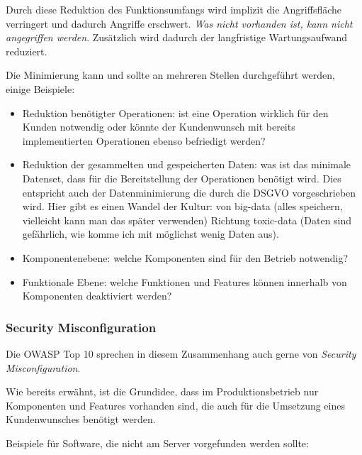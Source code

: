 Durch diese Reduktion des Funktionsumfangs wird implizit die Angriffsfläche verringert und dadurch Angriffe erschwert. \textit{Was nicht vorhanden ist, kann nicht angegriffen werden}. Zusätzlich wird dadurch der langfristige Wartungsaufwand reduziert.

Die Minimierung kann und sollte an mehreren Stellen durchgeführt werden, einige Beispiele:

\begin{itemize}
	\item Reduktion benötigter Operationen: ist eine Operation wirklich für den Kunden notwendig oder könnte der Kundenwunsch mit bereits implementierten Operationen ebenso befriedigt werden?
	\item Reduktion der gesammelten und gespeicherten Daten: was ist das minimale Datenset, dass für die Bereitstellung der Operationen benötigt wird. Dies entspricht auch der Datenminimierung die durch die DSGVO vorgeschrieben wird. Hier gibt es einen Wandel der Kultur: von big-data (alles speichern, vielleicht kann man das später verwenden) Richtung toxic-data (Daten sind gefährlich, wie komme ich mit möglichst wenig Daten aus).
	\item Komponentenebene: welche Komponenten sind für den Betrieb notwendig?
	\item Funktionale Ebene: welche Funktionen und Features können innerhalb von Komponenten deaktiviert werden?
\end{itemize}

\subsubsection{Security Misconfiguration}

Die OWASP Top 10 sprechen in diesem Zusammenhang auch gerne von \textit{Security Misconfiguration}.

Wie bereits erwähnt, ist die Grundidee, dass im Produktionsbetrieb nur Komponenten und Features vorhanden sind, die auch für die Umsetzung eines Kundenwunsches benötigt werden.

Beispiele für Software, die nicht am Server vorgefunden werden sollte:

